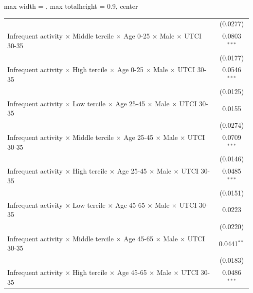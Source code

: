 \begin{table}[htbp]
\begin{adjustbox}{max width = \textwidth, max totalheight = 0.9\textheight, center}
\begin{tabular}{lc}
                                                                                                                 & (0.0277)\\   
         Infrequent activity $\times$ Middle tercile $\times$ Age 0-25 $\times$ Male $\times$ UTCI 30-35         & 0.0803$^{***}$\\   
                                                                                                                 & (0.0177)\\   
         Infrequent activity $\times$ High tercile $\times$ Age 0-25 $\times$ Male $\times$ UTCI 30-35           & 0.0546$^{***}$\\   
                                                                                                                 & (0.0125)\\   
         Infrequent activity $\times$ Low tercile $\times$ Age 25-45 $\times$ Male $\times$ UTCI 30-35           & 0.0155\\   
                                                                                                                 & (0.0274)\\   
         Infrequent activity $\times$ Middle tercile $\times$ Age 25-45 $\times$ Male $\times$ UTCI 30-35        & 0.0709$^{***}$\\   
                                                                                                                 & (0.0146)\\   
         Infrequent activity $\times$ High tercile $\times$ Age 25-45 $\times$ Male $\times$ UTCI 30-35          & 0.0485$^{***}$\\   
                                                                                                                 & (0.0151)\\   
         Infrequent activity $\times$ Low tercile $\times$ Age 45-65 $\times$ Male $\times$ UTCI 30-35           & 0.0223\\   
                                                                                                                 & (0.0220)\\   
         Infrequent activity $\times$ Middle tercile $\times$ Age 45-65 $\times$ Male $\times$ UTCI 30-35        & 0.0441$^{**}$\\   
                                                                                                                 & (0.0183)\\   
         Infrequent activity $\times$ High tercile $\times$ Age 45-65 $\times$ Male $\times$ UTCI 30-35          & 0.0486$^{***}$\\   

\end{tabular}
\end{adjustbox}
\end{table}
